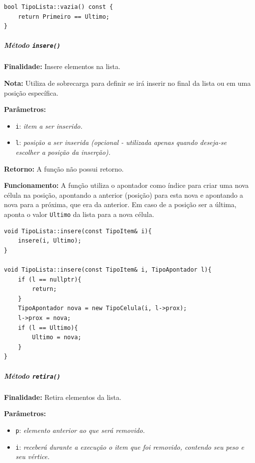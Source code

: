 \documentclass{article}
\begin{document}
\begin{verbatim}
bool TipoLista::vazia() const {
    return Primeiro == Ultimo;
}
\end{verbatim}



\subparagraph{Método \texttt{insere()}}

    \mbox{}\par
    \noindent
    \textbf{Finalidade:} Insere elementos na lista.

    \textbf{Nota:} Utiliza de sobrecarga para definir se irá inserir no final da lista ou em uma posição específica.

    \textbf{Parâmetros:}
    \begin{itemize}
       \item \texttt{i}: \textit{item a ser inserido.}
       \item \texttt{l}: \textit{posição a ser inserida (opcional - utilizada apenas quando deseja-se escolher a posição da inserção).}        
    \end{itemize}

    \textbf{Retorno:} A função não possui retorno.

    \textbf{Funcionamento:} A função utiliza o apontador como índice para criar uma nova célula na posição, apontando a anterior (posição) para esta nova e apontando a nova para a próxima, que era da anterior. Em caso de a posição ser a última, aponta o valor \texttt{Ultimo} da lista para a nova célula.

\begin{verbatim}
void TipoLista::insere(const TipoItem& i){
    insere(i, Ultimo);
}

void TipoLista::insere(const TipoItem& i, TipoApontador l){
    if (l == nullptr){
        return;
    }
    TipoApontador nova = new TipoCelula(i, l->prox);
    l->prox = nova;
    if (l == Ultimo){
        Ultimo = nova;
    }
}
\end{verbatim}



\subparagraph{Método \texttt{retira()}}

    \mbox{}\par
    \noindent
    \textbf{Finalidade:} Retira elementos da lista.

    \textbf{Parâmetros:}
    \begin{itemize}
       \item \texttt{p}: \textit{elemento anterior ao que será removido.}
       \item \texttt{i}: \textit{receberá durante a execução o item que foi removido, contendo seu peso e seu vértice.}        
    \end{itemize}
\end{document}
